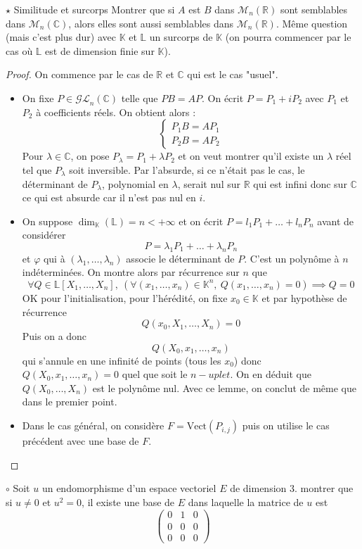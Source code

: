 \documentclass[french,a4paper]{article}
\newcommand{\R}{\mathbb{R}}
\newcommand{\C}{\mathbb{C}}
\newcommand{\K}{\mathbb{K}}
\renewcommand{\L}{\mathbb{L}}
\theoremstyle{plain}
\theoremstyle{definition}
\theoremstyle{remark}
\begin{document}
\begin{ex}{$\star$ Similitude et surcorps}
	Montrer que si $A$ est $B$ dans $\mathcal{M}_n(\R)$ sont semblables dans $\mathcal{M}_n(\C)$, alors elles sont aussi semblables dans $\mathcal{M}_n(\R)$. Même question (mais c'est plus dur) avec $\K$ et $\L$ un surcorps de $\K$ (on pourra commencer par le cas où $\L$ est de dimension finie sur $\K$).
\end{ex}
\begin{proof}
	On commence par le cas de $\R$ et $\C$ qui est le cas "usuel".
	\begin{itemize}
		\item On fixe $P\in\mathcal{GL}_n(\C)$ telle que $PB=AP$. On écrit $P=P_1+iP_2$ avec $P_1$ et $P_2$ à coefficients réels. On obtient alors : $$\begin{cases}
			P_1B=AP_1\\
			P_2B=AP_2
		\end{cases}$$ Pour $\lambda\in\C$, on pose $P_\lambda=P_1+\lambda P_2$ et on veut montrer qu'il existe un $\lambda$ réel tel que $P_\lambda$ soit inversible. Par l'absurde, si ce n'était pas le cas, le déterminant de $P_\lambda$, polynomial en $\lambda$, serait nul sur $\R$ qui est infini donc sur $\C$ ce qui est absurde car il n'est pas nul en $i$.
		\item On suppose $\dim_\K(\L)=n<+\infty$ et on écrit $P=l_1P_1+\ldots+l_nP_n$ avant de considérer $$P=\lambda_1P_1+\ldots+\lambda_nP_n$$ et $\varphi$ qui à $(\lambda_1,\ldots,\lambda_n)$ associe le déterminant de $P$. C'est un polynôme à $n$ indéterminées. On montre alors par récurrence sur $n$ que $$\forall Q\in\L[X_1,\ldots,X_n],\ (\forall(x_1,\ldots,x_n)\in\K^n,\ Q(x_1,\ldots,x_n)=0)\implies Q=0$$ OK pour l'initialisation, pour l'hérédité, on fixe $x_0\in\K$ et par hypothèse de récurrence $$Q(x_0,X_1,\ldots,X_n)=0$$ Puis on a donc $$Q(X_0,x_1,\ldots,x_n)$$ qui s'annule en une infinité de points (tous les $x_0$) donc $Q(X_0,x_1,\ldots,x_n)=0$ quel que soit le $n-uplet$. On en déduit que $Q(X_0,\ldots,X_n)$ est le polynôme nul. Avec ce lemme, on conclut de même que dans le premier point.
		\item Dans le cas général, on considère $F=\text{Vect}(P_{i,j})$ puis on utilise le cas précédent avec une base de $F$.
	\end{itemize}
\end{proof}

\begin{ex}{$\circ$}
	Soit $u$ un endomorphisme d'un espace vectoriel $E$ de dimension $3$. montrer que si $u\ne 0$ et $u^2=0$, il existe une base de $E$ dans laquelle la matrice de $u$ est $$\begin{pmatrix}
		0&1&0\\
		0&0&0\\
		0&0&0
	\end{pmatrix}$$
\end{ex}
\end{document}
